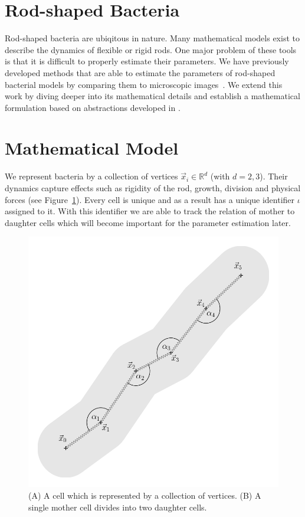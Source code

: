 \documentclass[twocolumn]{article}
\newcommand{\R}{\mathbb{R}}
\begin{document}
\pagestyle{fancy}

\section{Rod-shaped Bacteria}
Rod-shaped bacteria are ubiqitous in nature.
Many mathematical models exist to describe the dynamics of flexible or rigid rods.
One major problem of these tools is that it is difficult to properly estimate their parameters.
We have previously developed methods that are able to estimate the parameters of rod-shaped
bacterial models by comparing them to microscopic images~\cite{Pleyer2025,Pleyer2025_2}.
We extend this work by diving deeper into its mathematical details and establish a mathematical
formulation based on abstractions developed in \cite{Pleyer2025_3}.

\section{Mathematical Model}
We represent bacteria by a collection of vertices $\vec{x}_i\in\R^d$ (with $d=2,3$).
Their dynamics capture effects such as rigidity of the rod, growth, division and physical forces
(see Figure~\ref{fig:mechanics-division}).
Every cell is unique and as a result has a unique identifier $\iota$ assigned to it.
With this identifier we are able to track the relation of mother to daughter cells
which will become important for the parameter estimation later.

\begin{figure}[H]
    \centering
    \includegraphics[width=0.4\columnwidth]{figures/mechanics.png}%
    
    \caption{
        (A) A cell which is represented by a collection of vertices.
        (B) A single mother cell divides into two daughter cells.
    }
    \label{fig:mechanics-division}
\end{figure}
\end{document}
